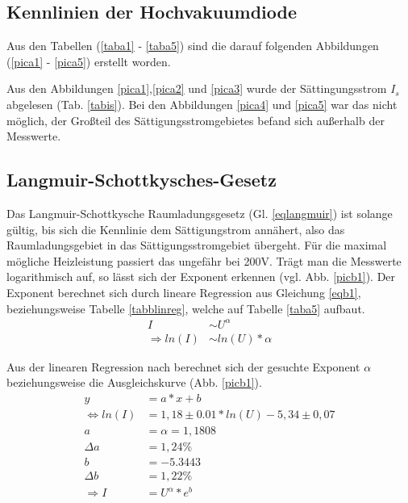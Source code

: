 \subsection{Kennlinien der Hochvakuumdiode} 
Aus den Tabellen (\ref{taba1} - \ref{taba5}) sind die darauf folgenden 
Abbildungen (\ref{pica1} - \ref{pica5}) erstellt worden.
    
     
Aus den Abbildungen \ref{pica1},\ref{pica2} und \ref{pica3} wurde der Sättingungsstrom 
$I_s$ abgelesen (Tab. \ref{tabis}). Bei den Abbildungen \ref{pica4} und \ref{pica5} war das 
nicht möglich, der Großteil des Sättigungsstromgebietes befand sich außerhalb der 
Messwerte.

\FloatBarrier
\subsection{Langmuir-Schottkysches-Gesetz}
Das Langmuir-Schottkysche Raumladungsgesetz (Gl. \ref{eqlangmuir}) ist solange gültig, bis sich die Kennlinie
dem Sättigungstrom annähert, also das Raumladungsgebiet in das Sättigungsstromgebiet 
übergeht. Für die maximal mögliche Heizleistung passiert das ungefähr bei 200V.
Trägt man die Messwerte logarithmisch auf, so lässt sich der Exponent erkennen (vgl. 
Abb. \ref{picb1}). Der Exponent berechnet sich durch lineare Regression \cite{linreg}
aus Gleichung \ref{eqb1}, beziehungsweise Tabelle \ref{tabblinreg}, welche auf Tabelle \ref{taba5} aufbaut.
\begin{align}
I&\sim U^\alpha \\
\Rightarrow ln(I)&\sim ln(U)*\alpha \label{eqb1}
\end{align}

\FloatBarrier
Aus der linearen Regression nach \cite{linreg} berechnet sich der gesuchte Exponent $\alpha$ beziehungsweise die Ausgleichskurve (Abb. \ref{picb1}).
\begin{align}
y&=a*x+b \\
\Leftrightarrow ln(I)&=1,18\pm0.01*ln(U)-5,34\pm0,07 \\
a&=\alpha=1,1808 \label{exalpha}\\
\Delta a&=1,24\% \\
b&=-5.3443 \\
\Delta b&=1,22\% \\
\Rightarrow I&=U^\alpha*e^b 
\end{align}

\FloatBarrier
